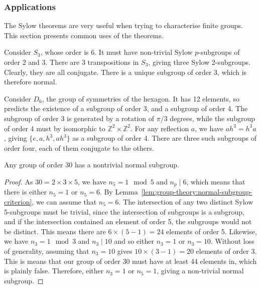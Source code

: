 \subsubsection{Applications}
The Sylow theorems are very useful when trying to characterise finite groups. This section presents common uses of the theorems.

\begin{example}
  Consider \(S_{3}\), whose order is 6. It must have non-trivial Sylow \(p\)-subgroups of order 2 and 3. There are 3 transpositions in \(S_{3}\), giving three Sylow 2-subgroups. Clearly, they are all conjugate.
  There is a unique subgroup of order 3, which is therefore normal.
\end{example}

\begin{example}
  Consider \(D_{6}\), the group of symmetries of the hexagon. It has 12 elements, so  predicts the existence of a subgroup of order 3, and a subgroup of order 4. The subgroup of order 3 is generated by a rotation of \(\pi / 3\) degrees, while the subgroup of order 4 must by isomorphic to \(\mathbb Z^{2} \times \mathbb Z^{2}\). For any reflection \(a\), we have \(ah^{3} = h^{3} a\), giving \(\{e, a, h^{3}, ah^{3}\}\) as a subgroup of order 4. There are three such subgroups of order four, each of them conjugate to the others.
\end{example}

\begin{proposition}
  Any group of order 30 has a nontrivial normal subgroup.
\end{proposition}

\begin{proof}
  As \(30 = 2 \times 3 \times 5\), we have \(n_{5} = 1 \mod 5\) and \(n_{p} \mid 6\), which means that there is either \(n_{5} = 1\) or \(n_{5} = 6\). By Lemma~\ref{lem:group-theory:normal-subgroup-criterion}, we can assume that \(n_{5} = 6\). The intersection of any two distinct Sylow 5-subgroups must be trivial, since the intersection of subgroups is a subgroup, and if the intersection contained an element of order 5, the subgroups would not be distinct. This means there are \(6 \times (5-1) = 24\) elements of order 5. Likewise, we have \(n_{3} = 1 \mod 3\) and \(n_{3} \mid 10\) and so either \(n_{3} = 1\) or  \(n_{3} = 10\). Without loss of generality, assuming that \(n_{3} = 10\) gives \(10 \times (3 - 1) = 20\) elements of order 3. This is means that our group of order 30 must have at least 44 elements in, which is plainly false. Therefore, either \(n_{3} = 1\) or \(n_{5} = 1\), giving a non-trivial normal subgroup.
\end{proof}

